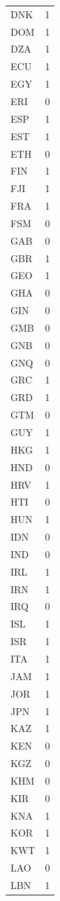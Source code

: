 \begin{tabular}{ll}
DNK & 1 \\
DOM & 1 \\
DZA & 1 \\
ECU & 1 \\
EGY & 1 \\
ERI & 0 \\
ESP & 1 \\
EST & 1 \\
ETH & 0 \\
FIN & 1 \\
FJI & 1 \\
FRA & 1 \\
FSM & 0 \\
GAB & 0 \\
GBR & 1 \\
GEO & 1 \\
GHA & 0 \\
GIN & 0 \\
GMB & 0 \\
GNB & 0 \\
GNQ & 0 \\
GRC & 1 \\
GRD & 1 \\
GTM & 0 \\
GUY & 1 \\
HKG & 1 \\
HND & 0 \\
HRV & 1 \\
HTI & 0 \\
HUN & 1 \\
IDN & 0 \\
IND & 0 \\
IRL & 1 \\
IRN & 1 \\
IRQ & 0 \\
ISL & 1 \\
ISR & 1 \\
ITA & 1 \\
JAM & 1 \\
JOR & 1 \\
JPN & 1 \\
KAZ & 1 \\
KEN & 0 \\
KGZ & 0 \\
KHM & 0 \\
KIR & 0 \\
KNA & 1 \\
KOR & 1 \\
KWT & 1 \\
LAO & 0 \\
LBN & 1 \\

\end{tabular}
